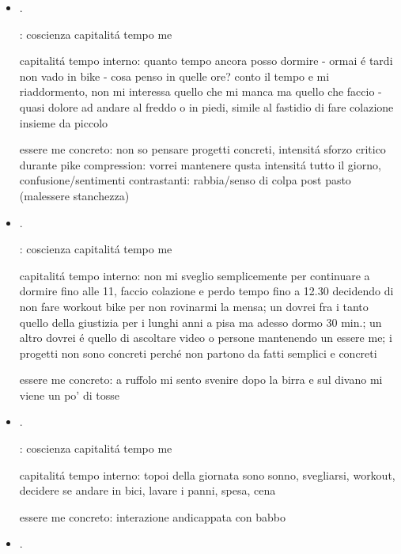 \begin{itemize}
essere me concreto: il freddo, la morte, l'impreparazione, la fatica nel fango e le pulsazioni nel petto; come prepararmi a condizione loquor ''neutralizzando'' gli impulsi?

\item {}.

: coscienza capitalit\'a tempo me

capitalit\'a tempo interno: quanto tempo ancora posso dormire - ormai \'e tardi non vado in bike - cosa penso in quelle ore? conto il tempo e mi riaddormento, non mi interessa quello che mi manca ma quello che faccio - quasi dolore ad andare al freddo o in piedi, simile al fastidio di fare colazione insieme da piccolo

essere me concreto: non so pensare progetti concreti, intensit\'a sforzo critico durante pike compression: vorrei mantenere qusta intensit\'a tutto il giorno, confusione/sentimenti contrastanti: rabbia/senso di colpa post pasto (malessere stanchezza)

\item {}.

: coscienza capitalit\'a tempo me

capitalit\'a tempo interno: non mi sveglio semplicemente per continuare a dormire fino alle 11, faccio colazione e perdo tempo fino a 12.30 decidendo di non fare workout bike per non rovinarmi la mensa; un dovrei fra i tanto quello della giustizia per i lunghi anni a pisa ma adesso dormo 30 min.; un altro dovrei \'e quello di ascoltare video o persone mantenendo un essere me; i progetti non sono concreti perch\'e non partono da fatti semplici e concreti

essere me concreto: a ruffolo mi sento svenire dopo la birra e sul divano mi viene un po' di tosse

\item {}.

: coscienza capitalit\'a tempo me

capitalit\'a tempo interno: topoi della giornata sono sonno, svegliarsi, workout, decidere se andare in bici, lavare i panni, spesa, cena

essere me concreto: interazione andicappata con babbo

\item {}.


\end{itemize}
